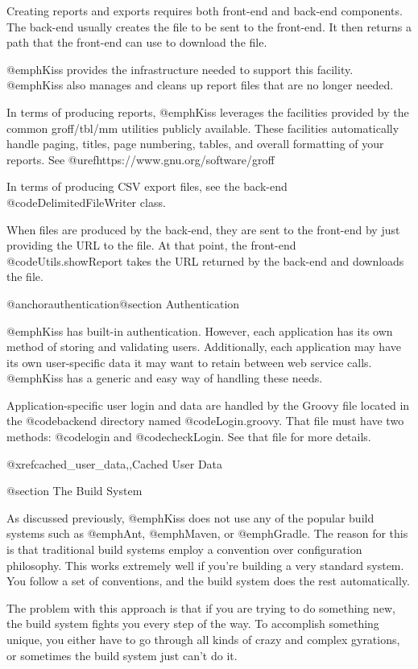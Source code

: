 Creating reports and exports requires both front-end and back-end components.
The back-end usually creates the file to be sent to the front-end.  It then returns
a path that the front-end can use to download the file.

@emph{Kiss} provides the infrastructure needed to support this facility.
@emph{Kiss} also manages and cleans up report files that are no longer needed.

In terms of producing reports, @emph{Kiss} leverages the facilities
provided by the common groff/tbl/mm utilities publicly available.
These facilities automatically handle paging, titles, page numbering,
tables, and overall formatting of your reports. See
@uref{https://www.gnu.org/software/groff}

In terms of producing CSV export files, see the back-end
@code{DelimitedFileWriter} class.

When files are produced by the back-end, they are sent to the
front-end by just providing the URL to the file.  At that point, the
front-end @code{Utils.showReport} takes the URL returned by the back-end
and downloads the file.

@anchor{authentication}@section Authentication

@emph{Kiss} has built-in authentication.  However, each application has its
own method of storing and validating users.  Additionally, each application
may have its own user-specific data it may want to retain between web service
calls. @emph{Kiss} has a generic and easy way of handling these needs.

Application-specific user login and data are handled by the Groovy file
located in the @code{backend} directory named @code{Login.groovy}.
That file must have two methods: @code{login} and @code{checkLogin}.  
See that file for more details.

@xref{cached_user_data,,Cached User Data}

@section The Build System

As discussed previously, @emph{Kiss} does not use any of the popular
build systems such as @emph{Ant}, @emph{Maven}, or @emph{Gradle}.  The
reason for this is that traditional build systems employ a convention
over configuration philosophy.  This works extremely well if you're
building a very standard system.  You follow a set of conventions, and
the build system does the rest automatically.

The problem with this approach is that if you are trying to do
something new, the build system fights you every step of the way.  To
accomplish something unique, you either have to go through all kinds of
crazy and complex gyrations, or sometimes the build system just can't
do it.

